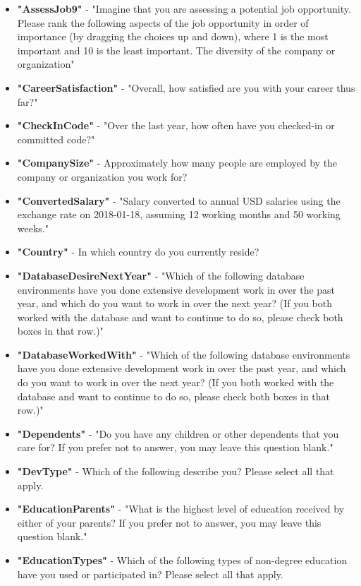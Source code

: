 \begin{appendices}
\begin{itemize}
        \item \textbf{"AssessJob9"} - "Imagine that you are assessing a potential job opportunity. Please rank the following aspects of the job opportunity in order of importance (by dragging the choices up and down), where 1 is the most important and 10 is the least important. The diversity of the company or organization"
        \item \textbf{"CareerSatisfaction"} - "Overall, how satisfied are you with your career thus far?"
        \item \textbf{"CheckInCode"} - "Over the last year, how often have you checked-in or committed code?"
        \item \textbf{"CompanySize"} - Approximately how many people are employed by the company or organization you work for?
        \item \textbf{"ConvertedSalary"} - "Salary converted to annual USD salaries using the exchange rate on 2018-01-18, assuming 12 working months and 50 working weeks."
        \item \textbf{"Country"} - In which country do you currently reside?
        \item \textbf{"DatabaseDesireNextYear"} - "Which of the following database environments have you done extensive development work in over the past year, and which do you want to work in over the next year?   (If you both worked with the database and want to continue to do so, please check both boxes in that row.)"
        \item \textbf{"DatabaseWorkedWith"} - "Which of the following database environments have you done extensive development work in over the past year, and which do you want to work in over the next year?   (If you both worked with the database and want to continue to do so, please check both boxes in that row.)"
        \item \textbf{"Dependents"} - "Do you have any children or other dependents that you care for? If you prefer not to answer, you may leave this question blank."
        \item \textbf{"DevType"} - Which of the following describe you? Please select all that apply.
        \item \textbf{"EducationParents"} - "What is the highest level of education received by either of your parents? If you prefer not to answer, you may leave this question blank."
        \item \textbf{"EducationTypes"} - Which of the following types of non-degree education have you used or participated in? Please select all that apply.

\end{itemize}
\end{appendices}
